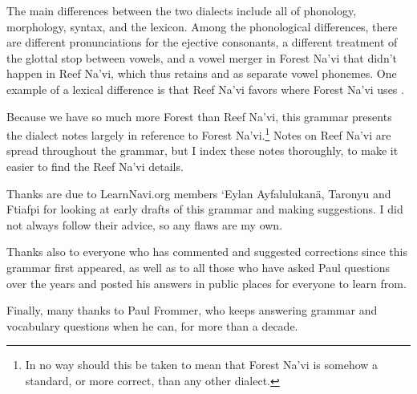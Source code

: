 The main differences between the two dialects include all of
phonology, morphology, syntax, and the lexicon.  Among the
phono\-logical differences, there are different pronunciations for the
ejective consonants, a different treatment of the glottal stop between
vowels, and a vowel merger in Forest Na'vi that didn't happen in Reef
Na'vi, which thus retains  and  as separate vowel phonemes.
One example of a lexical difference is that Reef Na'vi
favors   where Forest Na'vi uses .

Because we have so much more Forest than Reef Na'vi, this grammar
presents the dialect notes largely in reference to Forest
Na'vi.\footnote{In no way should this be taken to mean that Forest
Na'vi is somehow a standard, or more correct, than any other dialect.}
Notes on Reef Na'vi are spread throughout the grammar, but I index
these notes thoroughly, to make it easier to find the Reef Na'vi
details.



\vfill
Thanks are due to LearnNavi.org members `Eylan Ayfalulukanä, Taronyu
and Ftiafpi for looking at early drafts of this grammar and making
suggestions.  I did not always follow their advice, so any flaws are
my own.

Thanks also to everyone who has commented and suggested corrections
since this grammar first appeared, as well as to all those who have
asked Paul questions over the years and posted his answers in public
places for everyone to learn from.

Finally, many thanks to Paul Frommer, who keeps answering grammar
and vocabulary ques\-tions when he can, for more than a decade.



\bigskip

